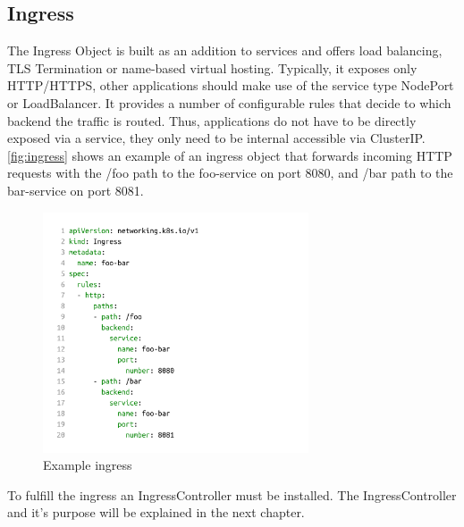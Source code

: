 \subsection{Ingress}

The Ingress Object is built as an addition to services and offers load balancing, TLS Termination or name-based virtual hosting.
Typically, it exposes only HTTP/HTTPS, other applications should make use of the service type NodePort or LoadBalancer.
It provides a number of configurable rules that decide to which backend the traffic is routed.
Thus, applications do not have to be directly exposed via a service, they only need to be internal accessible via ClusterIP.
\autoref{fig:ingress} shows an example of an ingress object that forwards incoming HTTP requests with the /foo path to the foo-service on port 8080, and /bar path to the bar-service on port 8081.

\begin{figure}[H]
    \centering
    \includegraphics[width=0.7\textwidth, left]{media/02/ingress}
    \caption{Example ingress}
    \label{fig:ingress}
\end{figure}

To fulfill the ingress an IngressController must be installed.
The IngressController and it's purpose will be explained in the next chapter.